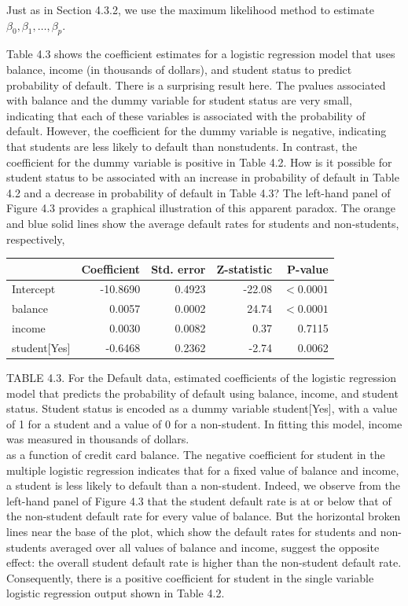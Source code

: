 \documentclass[10pt]{article}
\begin{document}
Just as in Section 4.3.2, we use the maximum likelihood method to estimate $\beta_{0}, \beta_{1}, \ldots, \beta_{p}$.

Table 4.3 shows the coefficient estimates for a logistic regression model that uses balance, income (in thousands of dollars), and student status to predict probability of default. There is a surprising result here. The pvalues associated with balance and the dummy variable for student status are very small, indicating that each of these variables is associated with the probability of default. However, the coefficient for the dummy variable is negative, indicating that students are less likely to default than nonstudents. In contrast, the coefficient for the dummy variable is positive in Table 4.2. How is it possible for student status to be associated with an increase in probability of default in Table 4.2 and a decrease in probability of default in Table 4.3? The left-hand panel of Figure 4.3 provides a graphical illustration of this apparent paradox. The orange and blue solid lines show the average default rates for students and non-students, respectively,

\begin{center}
\begin{tabular}{lrrrr}
\hline
 & Coefficient & Std. error & Z-statistic & P-value \\
\hline
Intercept & -10.8690 & 0.4923 & -22.08 & $<0.0001$ \\
balance & 0.0057 & 0.0002 & 24.74 & $<0.0001$ \\
income & 0.0030 & 0.0082 & 0.37 & 0.7115 \\
student[Yes] & -0.6468 & 0.2362 & -2.74 & 0.0062 \\
\hline
\end{tabular}
\end{center}

TABLE 4.3. For the Default data, estimated coefficients of the logistic regression model that predicts the probability of default using balance, income, and student status. Student status is encoded as a dummy variable student[Yes], with a value of 1 for a student and a value of 0 for a non-student. In fitting this model, income was measured in thousands of dollars.\\
as a function of credit card balance. The negative coefficient for student in the multiple logistic regression indicates that for a fixed value of balance and income, a student is less likely to default than a non-student. Indeed, we observe from the left-hand panel of Figure 4.3 that the student default rate is at or below that of the non-student default rate for every value of balance. But the horizontal broken lines near the base of the plot, which show the default rates for students and non-students averaged over all values of balance and income, suggest the opposite effect: the overall student default rate is higher than the non-student default rate. Consequently, there is a positive coefficient for student in the single variable logistic regression output shown in Table 4.2.
\end{document}
